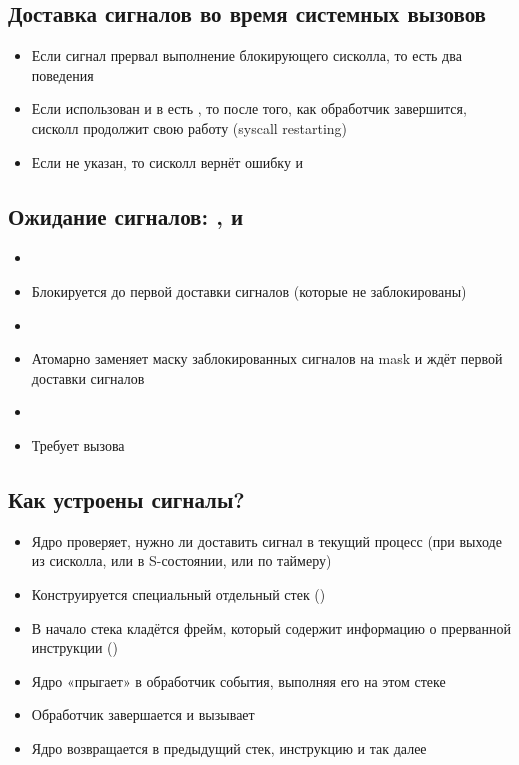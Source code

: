   \subsection{Доставка сигналов во время системных вызовов}
    \begin{itemize}
      \item Если сигнал прервал выполнение блокирующего сисколла, то есть два поведения
      \item Если использован  и в  есть , то после того, как обработчик завершится, сисколл продолжит свою работу (syscall restarting)
      \item Если не указан, то сисколл вернёт ошибку и 
    \end{itemize}

  \subsection{Ожидание сигналов: ,  и }
    \begin{itemize}
      \item {}
      \item Блокируется до первой доставки сигналов (которые не заблокированы)
      \item {}
      \item Атомарно заменяет маску заблокированных сигналов на mask и ждёт первой доставки сигналов
      \item {}
      \item Требует вызова 
    \end{itemize}
  
  \subsection{Как устроены сигналы?}
    \begin{itemize}
      \item Ядро проверяет, нужно ли доставить сигнал в текущий процесс (при выходе из сисколла, или в S-состоянии, или по таймеру)
      \item Конструируется специальный отдельный стек ()
      \item В начало стека кладётся фрейм, который содержит информацию о прерванной инструкции ()
      \item Ядро «прыгает» в обработчик события, выполняя его на этом стеке
      \item Обработчик завершается и вызывает 
      \item Ядро возвращается в предыдущий стек, инструкцию и так далее
    \end{itemize}
  
